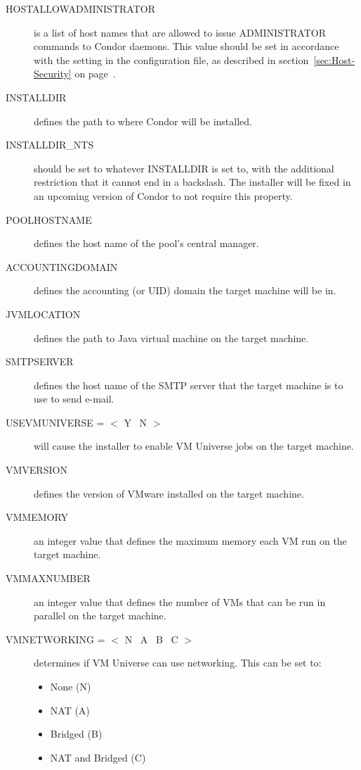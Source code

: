 \begin{description}
\item[HOSTALLOWADMINISTRATOR]
is a list of host names that are allowed to issue ADMINISTRATOR commands to
Condor daemons. This value should be set in accordance with the
 setting in the configuration file, 
as described in
section~\ref{sec:Host-Security} on page~\pageref{sec:Host-Security}.

\item[INSTALLDIR]
defines the path to where Condor will be installed. 

\item[INSTALLDIR\_NTS]
should be set to whatever INSTALLDIR is set to, with the additional
restriction that it cannot end in a backslash. The installer will be fixed
in an upcoming version of Condor to not require this property.

\item[POOLHOSTNAME]
defines the host name of the pool's central manager. 

\item[ACCOUNTINGDOMAIN] 
defines the accounting (or UID) domain the target machine will be in.

\item[JVMLOCATION]
defines the path to Java virtual machine on the target machine.

\item[SMTPSERVER]
defines the host name of the SMTP server that the target machine is to
use to send e-mail.

\item [USEVMUNIVERSE = $<$ Y \Bar\ N $>$]
will cause the installer to enable VM Universe jobs on the target machine.

\item [VMVERSION]
defines the version of VMware installed on the target machine.

\item [VMMEMORY]
an integer value that defines the maximum memory each VM run on the target
machine.

\item [VMMAXNUMBER]
an integer value that defines the number of VMs that can be run in parallel
on the target machine.

\item [VMNETWORKING = $<$ N \Bar\ A \Bar\ B \Bar\ C $>$]
determines if VM Universe can use networking. This can be set to:
\begin{itemize}
\item None (N)
\item NAT (A)
\item Bridged (B)
\item NAT and Bridged (C)
\end{itemize}
\end {description}

